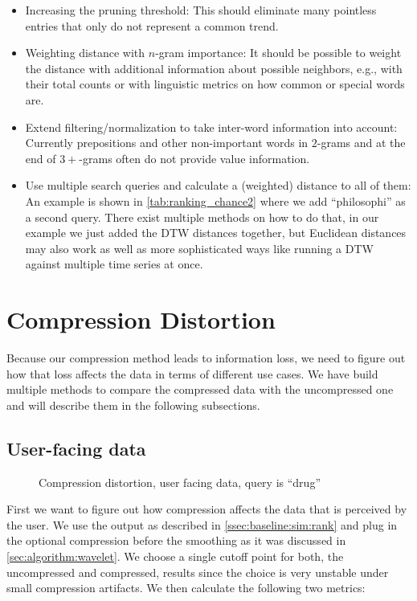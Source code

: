 \begin{itemize}
    \item Increasing the pruning threshold: This should eliminate many pointless entries that only do not represent a common trend.
    \item Weighting distance with $n$-gram importance: It should be possible to weight the distance with additional information about possible neighbors, e.g., with their total counts or with linguistic metrics on how common or special words are.
    \item Extend filtering/normalization to take inter-word information into account: Currently prepositions and other non-important words in $2$-grams and at the end of $3+$-grams often do not provide value information.
    \item Use multiple search queries and calculate a (weighted) distance to all of them: An example is shown in \autoref{tab:ranking_chance2} where we add \enquote{philosophi} as a second query. There exist multiple methods on how to do that, in our example we just added the DTW distances together, but Euclidean distances may also work as well as more sophisticated ways like running a DTW against multiple time series at once.
\end{itemize}



\section{Compression Distortion}
\label{sec:evaluation:distortion}

Because our compression method leads to information loss, we need to figure out how that loss affects the data in terms of different use cases. We have build multiple methods to compare the compressed data with the uncompressed one and will describe them in the following subsections.


\subsection{User-facing data}
\label{ssec:evaluation:distortion:user}

\begin{figure}
    \centering
    
    \caption[Compression distortion, user facing data]{Compression distortion, user facing data, query is \enquote{drug}}\label{fig:compression}
\end{figure}

First we want to figure out how compression affects the data that is perceived by the user. We use the output as described in \autoref{ssec:baseline:sim:rank} and plug in the optional compression before the smoothing as it was discussed in \autoref{sec:algorithm:wavelet}. We choose a single cutoff point for both, the uncompressed and compressed, results since the choice is very unstable under small compression artifacts. We then calculate the following two metrics:

